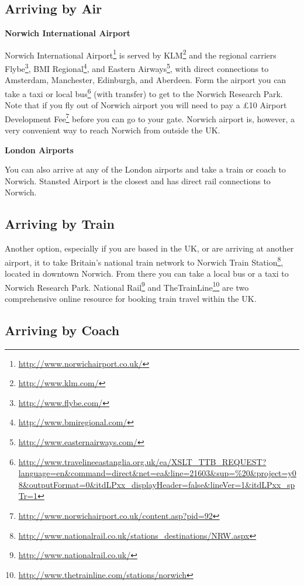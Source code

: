 \documentclass[12pt,]{book}
\let\rmarkdownfootnote\footnote%
\def\footnote{\protect\rmarkdownfootnote}
\renewcommand{\href}[2]{#2\footnote{\url{#1}}}
\theoremstyle{definition}
\theoremstyle{definition}
\theoremstyle{remark}
\begin{document}
\subsection*{Arriving by Air}\label{arriving-by-air}

\textbf{Norwich International Airport}

\href{http://www.norwichairport.co.uk/}{Norwich International Airport}
is served by \href{http://www.klm.com/}{KLM} and the regional carriers
\href{http://www.flybe.com/}{Flybe},
\href{http://www.bmiregional.com/}{BMI Regional}, and
\href{http://www.easternairways.com/}{Eastern Airways}, with direct
connections to Amsterdam, Manchester, Edinburgh, and Aberdeen. Form the
airport you can take a taxi or
\href{http://www.travelineeastanglia.org.uk/ea/XSLT_TTB_REQUEST?language=en\&command=direct\&net=ea\&line=21603\&sup=\%20\&project=y08\&outputFormat=0\&itdLPxx_displayHeader=false\&lineVer=1\&itdLPxx_spTr=1}{local
bus} (with transfer) to get to the Norwich Research Park. Note that if
you fly out of Norwich airport you will need to pay a
\href{http://www.norwichairport.co.uk/content.asp?pid=92}{£10 Airport
Development Fee} before you can go to your gate. Norwich airport is,
however, a very convenient way to reach Norwich from outside the UK.

\textbf{London Airports}

You can also arrive at any of the London airports and take a train or
coach to Norwich. Stansted Airport is the closest and has direct rail
connections to Norwich.

\subsection*{Arriving by Train}\label{arriving-by-train}

Another option, especially if you are based in the UK, or are arriving
at another airport, it to take Britain's national train network to
\href{http://www.nationalrail.co.uk/stations_destinations/NRW.aspx}{Norwich
Train Station}, located in downtown Norwich. From there you can take a
local bus or a taxi to Norwich Research Park.
\href{http://www.nationalrail.co.uk/}{National Rail} and
\href{http://www.thetrainline.com/stations/norwich}{TheTrainLine} are
two comprehensive online resource for booking train travel within the
UK.

\subsection*{Arriving by Coach}\label{arriving-by-coach}
\end{document}

